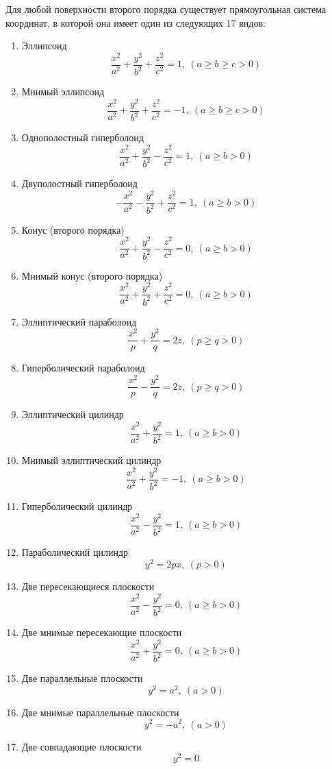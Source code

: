 \begin{theorem}
  Для любой поверхности второго порядка существует прямоугольная система координат, в которой она имеет один из следующих 17 видов:
  \begin{enumerate}
    \item Эллипсоид $$
      \frac{x^2}{a^2} + \frac{y^2}{b^2} + \frac{z^2}{c^2} = 1, ~(a \geq b \geq c > 0)
    $$
    \item Мнимый эллипсоид $$
      \frac{x^2}{a^2} + \frac{y^2}{b^2} + \frac{z^2}{c^2} = -1, ~(a \geq b \geq c > 0)
    $$
    \item Однополостный гиперболоид $$
      \frac{x^2}{a^2} + \frac{y^2}{b^2} - \frac{z^2}{c^2} = 1, ~(a \geq b > 0)
    $$
    \item Двуполостный гиперболоид $$
      -\frac{x^2}{a^2} - \frac{y^2}{b^2} + \frac{z^2}{c^2} = 1, ~(a \geq b > 0)
    $$
    \item Конус (второго порядка) $$
      \frac{x^2}{a^2} + \frac{y^2}{b^2} - \frac{z^2}{c^2} = 0, ~(a \geq b > 0)
    $$
    \item Мнимый конус (второго порядка) $$
      \frac{x^2}{a^2} + \frac{y^2}{b^2} + \frac{z^2}{c^2} = 0, ~(a \geq b > 0)
    $$
    \item Эллиптический параболоид $$
      \frac{x^2}{p} + \frac{y^2}{q} = 2z, ~(p \geq q > 0)
    $$
    \item Гиперболический параболоид $$
      \frac{x^2}{p} - \frac{y^2}{q} = 2z, ~(p \geq q > 0)
    $$
    \item Эллиптический цилиндр $$
      \frac{x^2}{a^2} + \frac{y^2}{b^2} = 1, ~(a \geq b > 0)      
    $$
    \item Мнимый эллиптический цилиндр $$
      \frac{x^2}{a^2} + \frac{y^2}{b^2} = -1, ~(a \geq b > 0)      
    $$
    \item Гиперболический цилиндр $$
    \frac{x^2}{a^2} - \frac{y^2}{b^2} = 1, ~(a \geq b > 0)      
    $$
    \item Параболический цилиндр $$
    y^2 = 2px, ~ (p > 0)
    $$
    \item Две пересекающиеся плоскости $$
    \frac{x^2}{a^2} - \frac{y^2}{b^2} = 0, ~(a \geq b > 0)      
    $$
    \item Две мнимые пересекающие плоскости $$
      \frac{x^2}{a^2} + \frac{y^2}{b^2} = 0, ~(a \geq b > 0)      
    $$
    \item Две параллельные плоскости $$
    y^2 = a^2, ~ (a > 0)
    $$
    \item Две мнимые параллельные плоскости $$
      y^2 = -a^2, ~ (a > 0)
    $$
    \item Две совпадающие плоскости $$
      y^2 = 0
    $$
  \end{enumerate}
\end{theorem}

